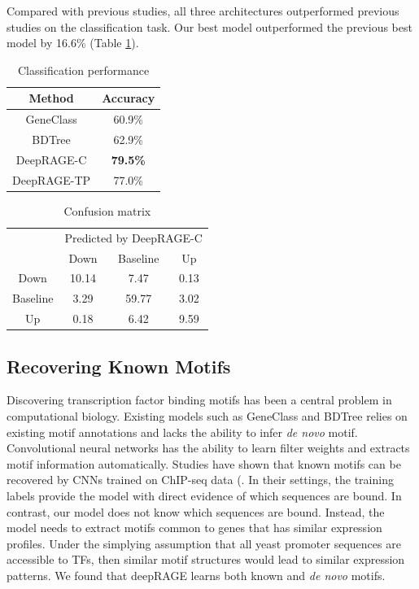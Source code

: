\documentclass{article}
\begin{document}
Compared with previous studies, all three architectures outperformed previous studies on the classification task. Our best model outperformed the previous best model by 16.6\% (Table \ref{table:classification performance}). 

\begin{table}[!hbt]
\caption{Classification performance}
\centering
 \begin{tabular}{|c | c|} 
 \hline
 Method & Accuracy \\
 \hline
 GeneClass & 60.9\% \\ 
 \hline
 BDTree & 62.9\% \\
 \hline
 DeepRAGE-C & \textbf{79.5\%} \\
 \hline
 DeepRAGE-TP & 77.0\% \\
 \hline
\end{tabular}
\label{table:classification performance}
\end{table}

\begin{table}[!hbt]
\caption{Confusion matrix}
\centering
 \begin{tabular}{|c | c c c|} 
 \hline
 {} & \multicolumn{3}{|l|}{Predicted by DeepRAGE-C} \\
  & Down & Baseline & Up \\ 
 \hline
 Down & 10.14 & 7.47 & 0.13 \\
 \hline
 Baseline & 3.29 & 59.77 & 3.02 \\
 \hline
 Up & 0.18 & 6.42 & 9.59 \\
 \hline
\end{tabular}
\label{table:confusion matrix}
\end{table}

\subsection{Recovering Known Motifs}
Discovering transcription factor binding motifs has been a central problem in computational biology. Existing models such as GeneClass and BDTree relies on existing motif annotations and lacks the ability to infer \textit{de novo} motif. Convolutional neural networks has the ability to learn filter weights and extracts motif information automatically. Studies have shown that known motifs can be recovered by CNNs trained on ChIP-seq data (\cite{Quang:2016jt,Kelley:2016bv,Alipanahi:2015fb}. In their settings, the training labels provide the model with direct evidence of which sequences are bound. In contrast, our model does not know which sequences are bound. Instead, the model needs to extract motifs common to genes that has similar expression profiles. Under the simplying assumption that all yeast promoter sequences are accessible to TFs, then similar motif structures would lead to similar expression patterns. We found that deepRAGE learns both known and \textit{de novo} motifs.
\end{document}
